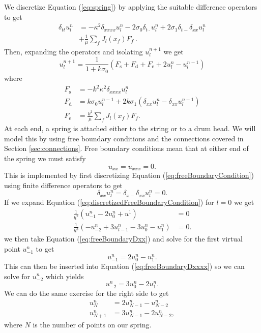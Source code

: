\documentclass{article}
\begin{document}
We discretize Equation (\ref{eq:spring}) by applying the suitable difference operators to get
\begin{equation}
  \begin{split}
  \delta_{tt} u^n_l &= -\kappa^2 \delta_{xxxx} u^n_l- 2 \sigma_0 \delta_{t\cdot} u^n_l + 2 \sigma_1 \delta_{t-} \delta_{xx}u^n_l\\
  & + \frac{1}{\mu} \sum_f J_l(x_f) F_f\ .
  \end{split}
\end{equation}
Then, expanding the operators and isolating $u^{n+1}_l$ we get
\begin{equation}
u^{n+1}_l = \frac{1}{1 + k\sigma_0} (F_\text{s} + F_\text{d} + F_\text{e} + 2u^n_l - u^{n-1}_l)
\end{equation}
where
\begin{align}
  F_\text{s} &= -k^2 \kappa^2 \delta_{xxxx} u^n_l\\
  F_\text{d} &= k\sigma_0u^{n-1}_l + 2k\sigma_1 (\delta_{xx}u^n_l - \delta_{xx}u^{n-1}_l)\\
  F_\text{e} &= \frac{k^2}{\mu} \sum_f J_l(x_f)F_f.
\end{align}
%
At each end, a spring is attached either to the string or to a drum head.
We will model this by using free boundary conditions and the connections covered in Section \ref{sec:connections}.
Free boundary conditions mean that at either end of the spring we must satisfy \cite{bilbao_numerical_2009}
\begin{equation}
  \label{eq:freeBoundaryCondition}
  u_{xx} = u_{xxx} = 0.
\end{equation}
%
This is implemented by first discretizing Equation (\ref{eq:freeBoundaryCondition}) using finite difference operators to get
\begin{equation}
  \label{eq:discretizedFreeBoundaryCondition}
  \delta_{xx} u^n_l = \delta_{x-}\delta_{xx} u^n_l = 0.
\end{equation}
%
If we expand Equation (\ref{eq:discretizedFreeBoundaryCondition}) for $l = 0$ we get
\begin{align}
  \frac{1}{h^2} (u^n_{-1} - 2 u^{n}_0 + u^{1}) &= 0 \label{eq:freeBoundaryDxx}\\
  \frac{1}{h^3} (-u^n_{-2} + 3u^n_{l-1} - 3u^n_0 - u^n_{1}) &= 0 \label{eq:freeBoundaryDxxxx}.
\end{align}
we then take Equation (\ref{eq:freeBoundaryDxx}) and solve for the first virtual point $u^n_{-1}$ to get
\begin{equation}
  u^n_{-1} = 2 u^n_0 - u^n_1.
\end{equation}
This can then be inserted into Equation (\ref{eq:freeBoundaryDxxxx}) so we can solve for $u^n_{-2}$ which yields
\begin{equation}
  u^n_{-2} = 3 u^n_0 - 2u^n_1.
\end{equation}
%
We can do the same exercise for the right side to get
\begin{align}
  u^n_{N} &= 2 u^n_{N-1} - u^n_{N-2}\\
  u^n_{N+1} &= 3 u^n_{N-1} - 2 u^n_{N-2},
\end{align}
where $N$ is the number of points on our spring.
\end{document}
